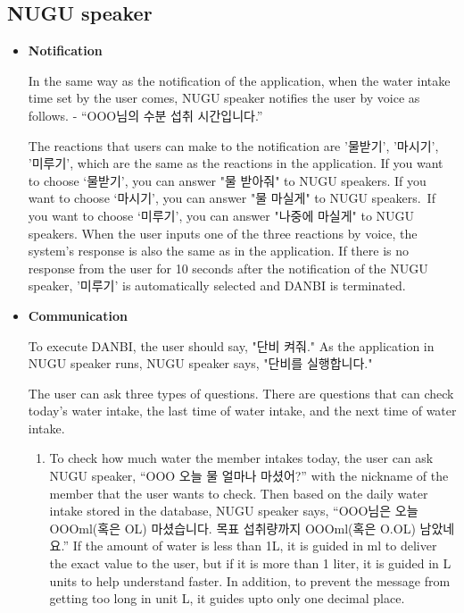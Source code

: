 \documentclass[conference]{IEEEtran}
\begin{document}
\subsection{NUGU speaker}
\begin{itemize}
\setlength{\parindent}{2ex}
\item \textbf{Notification}

In the same way as the notification of the application, when the water intake time set by the user comes, NUGU speaker notifies the user by voice as follows. - “OOO님의 수분 섭취 시간입니다.”

The reactions that users can make to the notification are '물받기', '마시기', '미루기', which are the same as the reactions in the application. If you want to choose ‘물받기’, you can answer "물 받아줘" to NUGU speakers. If you want to choose ‘마시기’, you can answer "물 마실게" to NUGU speakers. If you want to choose ‘미루기’, you can answer "나중에 마실게" to NUGU speakers. When the user inputs one of the three reactions by voice, the system's response is also the same as in the application. If there is no response from the user for 10 seconds after the notification of the NUGU speaker, '미루기' is automatically selected and DANBI is terminated.

\item \textbf{Communication}

To execute DANBI, the user should say, "단비 켜줘." As the application in NUGU speaker runs, NUGU speaker says, "단비를 실행합니다."

The user can ask three types of questions. There are questions that can check today's water intake, the last time of water intake, and the next time of water intake.

\begin{enumerate}
\setlength{\parindent}{2ex}

\item To check how much water the member intakes today, the user can ask NUGU speaker, “OOO 오늘 물 얼마나 마셨어?” with the nickname of the member that the user wants to check. Then based on the daily water intake stored in the database, NUGU speaker says, “OOO님은 오늘 OOOml(혹은 OL) 마셨습니다. 목표 섭취량까지 OOOml(혹은 O.OL) 남았네요.” If the amount of water is less than 1L, it is guided in ml to deliver the exact value to the user, but if it is more than 1 liter, it is guided in L units to help understand faster. In addition, to prevent the message from getting too long in unit L, it guides upto only one decimal place.


\end{enumerate}
\end{itemize}
\end{document}
